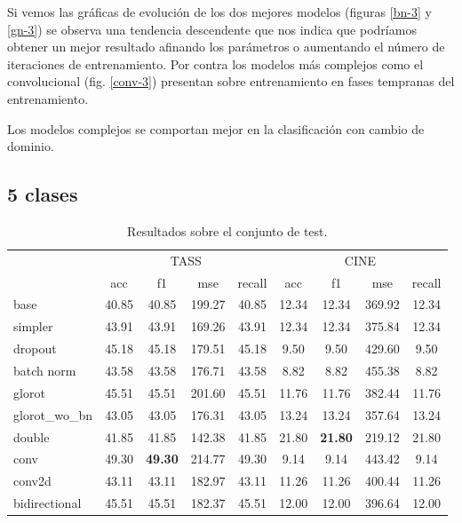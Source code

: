 Si vemos las gráficas de evolución de los dos mejores modelos (figuras \ref{bn-3} y \ref{gn-3}) se observa una tendencia descendente que nos indica que podríamos obtener un mejor resultado afinando los parámetros o aumentando el número de iteraciones de entrenamiento. Por contra los modelos más complejos como el convolucional (fig. \ref{conv-3}) presentan sobre entrenamiento en fases tempranas del entrenamiento.

Los modelos complejos se comportan mejor en la clasificación con cambio de dominio.


\subsection{5 clases}

\begin{table}[H]
	\centering
	\begin{tabular}{|l|cccc|cccc|}
		\hline
		& \multicolumn{4}{c|}{TASS} & \multicolumn{4}{c|}{CINE} \\
		\cline{2-9}
		&    acc &     f1 &    mse &  recall & acc &     f1 &    mse &  recall \\
		\hline
		base          &  40.85 &  40.85 &  199.27 &   40.85 &  12.34 &  12.34 &  369.92 &   12.34 \\
		simpler       &  43.91 &  43.91 &  169.26 &   43.91 &  12.34 &  12.34 &  375.84 &   12.34 \\
		dropout   &  45.18 &  45.18 &  179.51 &   45.18  &   9.50 &   9.50 &  429.60 &    9.50\\
		batch norm    &  43.58 &  43.58 &  176.71 &   43.58 &   8.82 &   8.82 &  455.38 &    8.82\\
		glorot        &  45.51 &  45.51 &  201.60 &   45.51 &  11.76 &  11.76 &  382.44 &   11.76 \\
		glorot\_wo\_bn  &  43.05 &  43.05 &  176.31 &   43.05 &  13.24 &  13.24 &  357.64 &   13.24 \\
		double        &  41.85 &  41.85 &  142.38 &   41.85 &  21.80 &  \textbf{21.80} &  219.12 &   21.80\\
		conv          &  49.30 &  \textbf{49.30} &  214.77 &   49.30 &   9.14 &   9.14 &  443.42 &    9.14\\
		conv2d        &  43.11 &  43.11 &  182.97 &   43.11 &  11.26 &  11.26 &  400.44 &   11.26\\
		bidirectional &  45.51 &  45.51 &  182.37 &   45.51 &  12.00 &  12.00 &  396.64 &   12.00\\
		\hline
	\end{tabular}
	\caption{Resultados sobre el conjunto de test.}
	\label{test-dl-5-clases}
\end{table}


